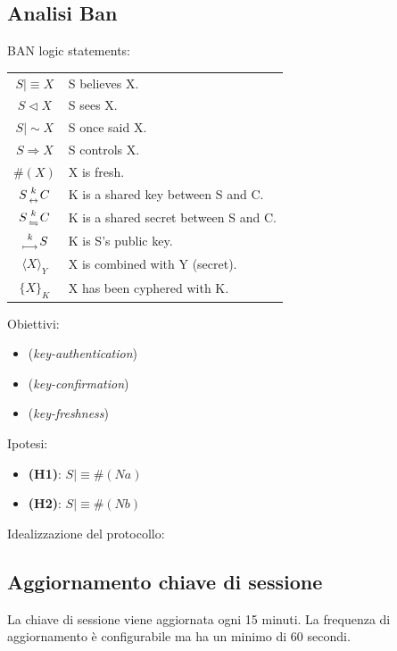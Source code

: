 \documentclass[a4paper,titlepage]{article}
\begin{document}
\subsection{Analisi Ban}

BAN logic statements:
\begin{center}
\begin{tabular}{|c | l|} \hline
$ S \mid \equiv X  $ & S believes X.\\
$ S \lhd X  $ & S sees X.\\
$ S \mid \sim X  $ & S once said X.\\
$ S \Rightarrow X $ & S controls X.\\ 
$ \#(X) $ & X is fresh.\\
$S {k \atop \leftrightarrow} C $ & K is a shared key between S and C.\\ 
$S {k \atop \leftrightharpoons} C $ & K is a shared secret between S and C.\\ 
${k  \atop \longmapsto} S $ & K is S's public key.\\
$\langle X \rangle_{Y}$ & X is combined with Y (secret).\\
$\{X\}_{K}$ & X has been cyphered with K.\\ \hline
\end{tabular}
\end{center}

Obiettivi:
\begin{itemize}
\item {}  (\textit{key-authentication})
\item {}  (\textit{key-confirmation})
\item {}  (\textit{key-freshness})
\end{itemize}

Ipotesi:\\
\begin{itemize}
\item \textbf{(H1)}: $ S \mid \equiv \#(Na) $
\item \textbf{(H2)}: $ S \mid \equiv \#(Nb) $

\end{itemize}
Idealizzazione del protocollo:\\


\subsection{Aggiornamento chiave di sessione}
La chiave di sessione viene aggiornata ogni 15 minuti. La frequenza di aggiornamento è configurabile ma ha un minimo di 60 secondi. 
\end{document}
